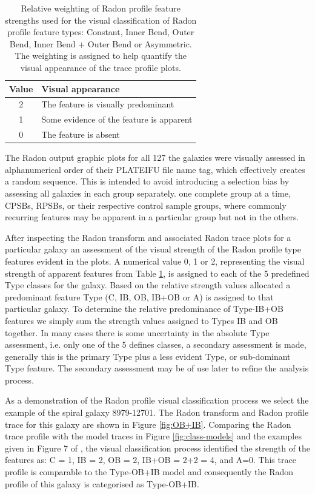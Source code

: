 \begin{table}
    \caption[Relative weighting of Radon profile feature strengths used in visual classification]{Relative weighting of Radon profile feature strengths used for the visual classification of Radon profile feature types: Constant, Inner Bend, Outer Bend, Inner Bend + Outer Bend or Asymmetric. The weighting is assigned to help quantify the visual appearance of the trace profile plots.}
    \label{tab:features}
    \centering
    \begin{tabular}{cl}
    \hline
    Value & Visual appearance \\
    \hline
    2 & The feature is visually predominant \\
    1 & Some evidence of the feature is apparent \\
    0 & The feature is absent \\
    \hline
    \end{tabular}
\end{table}

The Radon output graphic plots for all 127 the galaxies were visually assessed in alphanumerical order of their PLATEIFU file name tag, which effectively creates a random sequence. This is intended to avoid introducing a selection bias by assessing all galaxies in each group separately. one complete group at a time, CPSBs, RPSBs, or their respective control sample groups, where commonly recurring features may be apparent in a particular group but not in the others.

After inspecting the Radon transform and associated Radon trace plots for a particular galaxy an assessment of the visual strength of the Radon profile type features evident in the plots. A numerical value 0, 1 or 2, representing the visual strength of apparent features from Table \ref{tab:features}, is assigned to each of the 5 predefined Type classes for the galaxy. Based on the relative strength values allocated a predominant feature Type (C, IB, OB, IB+OB or A) is assigned to that particular galaxy. To determine the relative predominance of Type-IB+OB features we simply sum the strength values assigned to Types IB and OB together. 
In many cases there is some uncertainty in the absolute Type assessment, i.e. only one of the 5 defines classes, a secondary assessment is made,  generally this is the primary Type plus a less evident Type, or sub-dominant Type feature. The secondary assessment may be of use later to refine the analysis process.

As a demonstration of the Radon profile visual classification process we select the example of the spiral galaxy 8979-12701. The Radon transform and Radon profile trace for this galaxy are shown in Figure \ref{fig:OB+IB}. Comparing the Radon trace profile with the model traces in Figure \ref{fig:class-models} and the examples given in  Figure 7 of \cite{2018MNRAS.480.2217S}, the visual classification process identified the strength of the features as: C = 1, IB = 2, OB = 2, IB+OB = 2+2 = 4, and A=0. This trace profile is comparable to the Type-OB+IB model and consequently the Radon profile of this galaxy is categorised as Type-OB+IB.

